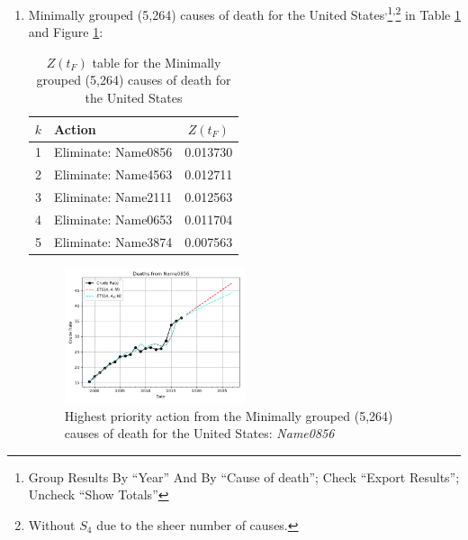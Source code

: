\documentclass[12pt, a4paper, twocolumn]{article}
\begin{document}
\begin{enumerate}
  \vfill\eject
  \item Minimally grouped (5,264) causes of death for the United States\cite{centers2017underlying}\textsuperscript{,}\footnote{Group Results By \enquote{Year} And By \enquote{Cause of death}; Check \enquote{Export Results}; Uncheck \enquote{Show Totals}}\textsuperscript{,}\footnote{Without $S_4$ due to the sheer number of causes.} in Table \ref{table:ztable7} and Figure \ref{fig:k7}:
    \begin{table}[H]
      \centering
      \begin{tabular}{clc}
        \toprule
          $k$ & Action              & $Z(t_F)$ \\
        \midrule
          1   & Eliminate: Name0856 & 0.013730 \\
          2   & Eliminate: Name4563 & 0.012711 \\
          3   & Eliminate: Name2111 & 0.012563 \\
          4   & Eliminate: Name0653 & 0.011704 \\
          5   & Eliminate: Name3874 & 0.007563 \\
        \bottomrule
      \end{tabular}
      \caption{$Z(t_F)$ table for the Minimally grouped (5,264) causes of death for the United States}
      \label{table:ztable7}
    \end{table}
    \begin{figure}[H]
      \centering
      \includegraphics[width=0.5\textwidth]{results/US_ICD10_MINIMALLY_GROUPED/Name0856_ets.png}
      \caption{Highest priority action from the Minimally grouped (5,264) causes of death for the United States: \textit{Name0856}}\label{fig:k7}
    \end{figure}


\end{enumerate}
\end{document}
